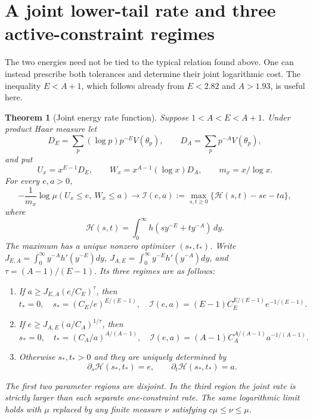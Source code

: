 \documentclass[11pt,letterpaper]{article}
\newtheorem{theorem}{Theorem}[section]
\theoremstyle{definition}
\theoremstyle{remark}
\newcommand{\1}{\mathbf 1}
\begin{document}
\section{A joint lower-tail rate and three active-constraint regimes}
\label{p04:sec:joint-rate}

The two energies need not be tied to the typical relation found above.
One can instead prescribe both tolerances and determine their joint
logarithmic cost. The inequality $E<A+1$, which follows already from
$E<2.82$ and $A>1.93$, is useful here.

\begin{theorem}[Joint energy rate function]
\label{p04:thm:joint-energy-rate}
Suppose $1<A<E<A+1$. Under product Haar measure let
\[
 D_E=\sum_p(\log p)p^{-E}V(\theta_p),\qquad
 D_A=\sum_pp^{-A}V(\theta_p),
\]
and put
\[
 U_x=x^{E-1}D_E,\qquad
 W_x=x^{A-1}(\log x)D_A,\qquad m_x=x/\log x.
\]
For every $e,a>0$,
\begin{equation}\label{p04:eq:joint-energy-rate}
 -\frac1{m_x}\log\mu(U_x\le e,\ W_x\le a)
 \longrightarrow \mathcal I(e,a)
 :=\max_{s,t\ge0}\{\mathcal H(s,t)-se-ta\},
\end{equation}
where
\[
 \mathcal H(s,t)=\int_0^\infty h(sy^{-E}+ty^{-A})\,dy.
\]
The maximum has a unique nonzero optimizer $(s_*,t_*)$. Write
$J_{E,A}=\int_0^\infty y^{-A}h'(y^{-E})dy$,
$J_{A,E}=\int_0^\infty y^{-E}h'(y^{-A})dy$, and
$\tau=(A-1)/(E-1)$. Its three regimes are as follows:
\begin{enumerate}
\item If $a\ge J_{E,A}(e/C_E)^\tau$, then
\[
 t_*=0,\quad s_*=(C_E/e)^{E/(E-1)},\quad
 \mathcal I(e,a)=(E-1)C_E^{E/(E-1)}e^{-1/(E-1)}.
\]
\item If $e\ge J_{A,E}(a/C_A)^{1/\tau}$, then
\[
 s_*=0,\quad t_*=(C_A/a)^{A/(A-1)},\quad
 \mathcal I(e,a)=(A-1)C_A^{A/(A-1)}a^{-1/(A-1)}.
\]
\item Otherwise $s_*,t_*>0$ and they are uniquely determined by
\[
 \partial_s\mathcal H(s_*,t_*)=e,\qquad
 \partial_t\mathcal H(s_*,t_*)=a.
\]
\end{enumerate}
The first two parameter regions are disjoint. In the third region
the joint rate is strictly larger than each separate one-constraint
rate. The same logarithmic limit holds with $\mu$ replaced by any
finite measure $\nu$ satisfying $c\mu\le\nu\le\mu$.
\end{theorem}
\end{document}
